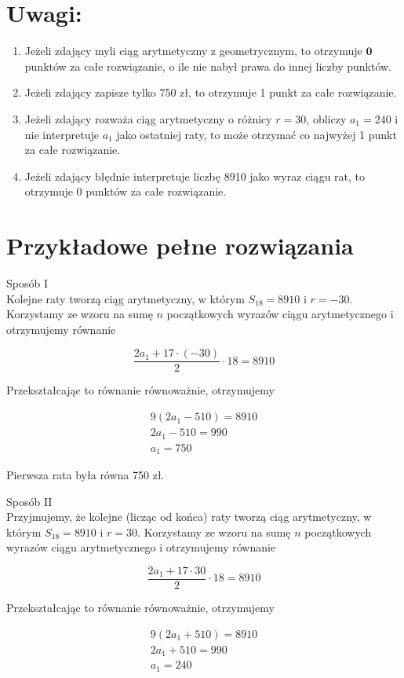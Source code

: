\documentclass[10pt]{article}
\begin{document}
\section*{Uwagi:}
\begin{enumerate}
  \item Jeżeli zdający myli ciąg arytmetyczny z geometrycznym, to otrzymuje $\mathbf{0}$ punktów za całe rozwiązanie, o ile nie nabył prawa do innej liczby punktów.
  \item Jeżeli zdający zapisze tylko 750 zł, to otrzymuje 1 punkt za całe rozwiązanie.
  \item Jeżeli zdający rozważa ciąg arytmetyczny o różnicy $r=30$, obliczy $a_{1}=240$ i nie interpretuje $a_{1}$ jako ostatniej raty, to może otrzymać co najwyżej 1 punkt za całe rozwiązanie.
  \item Jeżeli zdający błędnie interpretuje liczbę 8910 jako wyraz ciągu rat, to otrzymuje 0 punktów za całe rozwiązanie.
\end{enumerate}

\section*{Przykładowe pełne rozwiązania}
Sposób I\\
Kolejne raty tworzą ciąg arytmetyczny, w którym $S_{18}=8910$ i $r=-30$. Korzystamy ze wzoru na sumę $n$ początkowych wyrazów ciągu arytmetycznego i otrzymujemy równanie

$$
\frac{2 a_{1}+17 \cdot(-30)}{2} \cdot 18=8910
$$

Przekształcając to równanie równoważnie, otrzymujemy

$$
\begin{gathered}
9\left(2 a_{1}-510\right)=8910 \\
2 a_{1}-510=990 \\
a_{1}=750
\end{gathered}
$$

Pierwsza rata była równa 750 zł.

Sposób II\\
Przyjmujemy, że kolejne (licząc od końca) raty tworzą ciąg arytmetyczny, w którym $S_{18}=8910$ i $r=30$. Korzystamy ze wzoru na sumę $n$ początkowych wyrazów ciągu arytmetycznego i otrzymujemy równanie

$$
\frac{2 a_{1}+17 \cdot 30}{2} \cdot 18=8910
$$

Przekształcając to równanie równoważnie, otrzymujemy

$$
\begin{gathered}
9\left(2 a_{1}+510\right)=8910 \\
2 a_{1}+510=990 \\
a_{1}=240
\end{gathered}
$$
\end{document}
